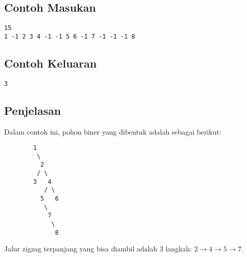 \documentclass{article}
\begin{document}
\begin{multicols}{2}
\subsection*{Contoh Masukan}
\begin{lstlisting}
15
1 -1 2 3 4 -1 -1 5 6 -1 7 -1 -1 -1 8
\end{lstlisting}
\columnbreak
\subsection*{Contoh Keluaran}
\begin{lstlisting}
3
\end{lstlisting}
\end{multicols}

\subsection*{Penjelasan}

Dalam contoh ini, pohon biner yang dibentuk adalah sebagai berikut:
\begin{verbatim}
        1
         \
          2
         / \
        3   4
           / \
          5   6
           \
            7
             \
              8
\end{verbatim}

Jalur zigzag terpanjang yang bisa diambil adalah 3 langkah:
$2 \xrightarrow{} 4 \xrightarrow{} 5 \xrightarrow{} 7.$
\end{document}
